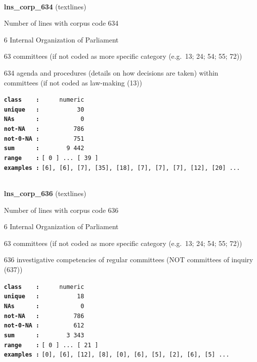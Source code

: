 \documentclass[]{article}
\begin{document}
~

\textbf{lns\_corp\_634} (textlines)

Number of lines with corpus code 634

6 Internal Organization of Parliament

63 committees (if not coded as more specific category (e.g.~13; 24; 54;
55; 72))

634 agenda and procedures (details on how decisions are taken) within
committees (if not coded as law-making (13))

\textbf{\texttt{class\ \ \ \ :}} \texttt{~~~~~numeric}\\
\textbf{\texttt{unique\ \ \ :}} \texttt{~~~~~~~~~~30}\\
\textbf{\texttt{NAs\ \ \ \ \ \ :}} \texttt{~~~~~~~~~~~0}\\
\textbf{\texttt{not-NA\ \ \ :}} \texttt{~~~~~~~~~786}\\
\textbf{\texttt{not-0-NA\ :}} \texttt{~~~~~~~~~751}\\
\textbf{\texttt{sum\ \ \ \ \ \ :}} \texttt{~~~~~~~9~442}\\
\textbf{\texttt{range\ \ \ \ :}}
\texttt{{[}\ 0\ {]}\ ...\ {[}\ 39\ {]}}\\
\textbf{\texttt{examples\ :}}
\texttt{{[}6{]},\ {[}6{]},\ {[}7{]},\ {[}35{]},\ {[}18{]},\ {[}7{]},\ {[}7{]},\ {[}7{]},\ {[}12{]},\ {[}20{]}\ ...}\\

~

\textbf{lns\_corp\_636} (textlines)

Number of lines with corpus code 636

6 Internal Organization of Parliament

63 committees (if not coded as more specific category (e.g.~13; 24; 54;
55; 72))

636 investigative competencies of regular committees (NOT committees of
inquiry (637))

\textbf{\texttt{class\ \ \ \ :}} \texttt{~~~~~numeric}\\
\textbf{\texttt{unique\ \ \ :}} \texttt{~~~~~~~~~~18}\\
\textbf{\texttt{NAs\ \ \ \ \ \ :}} \texttt{~~~~~~~~~~~0}\\
\textbf{\texttt{not-NA\ \ \ :}} \texttt{~~~~~~~~~786}\\
\textbf{\texttt{not-0-NA\ :}} \texttt{~~~~~~~~~612}\\
\textbf{\texttt{sum\ \ \ \ \ \ :}} \texttt{~~~~~~~3~343}\\
\textbf{\texttt{range\ \ \ \ :}}
\texttt{{[}\ 0\ {]}\ ...\ {[}\ 21\ {]}}\\
\textbf{\texttt{examples\ :}}
\texttt{{[}0{]},\ {[}6{]},\ {[}12{]},\ {[}8{]},\ {[}0{]},\ {[}6{]},\ {[}5{]},\ {[}2{]},\ {[}6{]},\ {[}5{]}\ ...}\\
\end{document}
